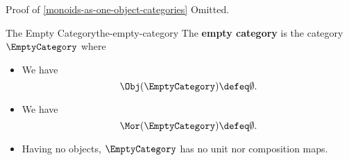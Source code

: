 \begin{Proof}{Proof of \cref{monoids-as-one-object-categories}}%
    Omitted.%
\end{Proof}
\begin{example}{The Empty Category}{the-empty-category}%
    The \textbf{empty category} is the category $\EmptyCategory$ where%
    \begin{itemize}
        \item{}We have
            \[
                \Obj(\EmptyCategory)
                \defeq
                \emptyset.
            \]%
        \item{}We have
            \[
                \Mor(\EmptyCategory)
                \defeq
                \emptyset.
            \]%
        \item{}Having no objects, $\EmptyCategory$ has no unit nor composition maps.
    \end{itemize}
\end{example}
